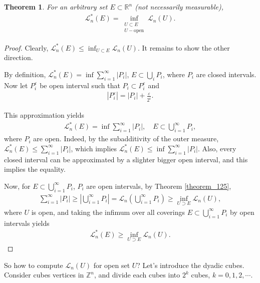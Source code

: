 \documentclass[11pt]{book}
\newtheorem{theorem}{Theorem}[chapter]
\theoremstyle{definition}
\numberwithin{equation}{chapter}
\begin{document}
\begin{theorem}\label{theorem_122}
For an arbitrary set $E \subset \mathbb{R}^n$ (not necessarily measurable),
\begin{align*}
    \mathcal{L}_n^*(E) = \inf_{\substack{U \subset E\\ U - \text{open}}} \mathcal{L}_n(U).
\end{align*}
\end{theorem}
\begin{proof}
Clearly, $\mathcal{L}_n^*(E) \leq \inf_{U \subset E} \mathcal{L}_n(U)$. It remains to show the other direction.

By definition, $\mathcal{L}^*_n(E) = \inf \sum^\infty_{i=1} \left|P_i\right|$, $E \subset \bigcup_i P_i$, where $P_i$ are closed intervals. Now let $P_i^\varepsilon$ be open interval such that $P_i \subset P_i^\varepsilon$ and
\begin{align*}
    \left|P_i^\varepsilon\right| = \left|P_i\right| + \frac{\varepsilon}{2^i}.
\end{align*}

This approximation yields
\begin{align*}
    \mathcal{L}_n^*(E) = \inf \sum^\infty_{i=1} \left|P_i\right|, \quad E \subset \bigcup^\infty_{i=1} P_i,
\end{align*}
where $P_i$ are open. Indeed, by the subadditivity of the outer measure, $\mathcal{L}_n^*(E) \leq \sum^\infty_{i=1} \left|P_i\right|$, which implies $\mathcal{L}_n^*(E) \leq \inf \sum^\infty_{i=1} \left|P_i\right|$. Also, every closed interval can be approximated by a slighter bigger open interval, and this implies the equality.

Now, for $E \subset \bigcup^\infty_{i=1}P_i$, $P_i$ are open intervals, by Theorem \ref{theorem_125},
\begin{align*}
    \sum^\infty_{i=1} \left|P_i\right| \geq \left|\bigcup^\infty_{i=1}P_i\right| = \mathcal{L}_n\left(\bigcup^\infty_{i=1}P_i\right) \geq \inf_{U \supset E} \mathcal{L}_n(U),
\end{align*}
where $U$ is open, and taking the infimum over all coverings $E \subset \bigcup^\infty_{i=1}P_i$ by open intervals yields
\begin{align*}
    \mathcal{L}_n^*(E) \geq  \inf_{U \supset E} \mathcal{L}_n(U).
\end{align*}
\end{proof}

\medskip

So how to compute $\mathcal{L}_n(U)$ for open set $U$? Let's introduce the dyadic cubes. Consider cubes vertices in $\mathbb{Z}^n$, and divide each cubes into $2^k$ cubes, $k = 0,1,2,\cdots$. 
\end{document}
